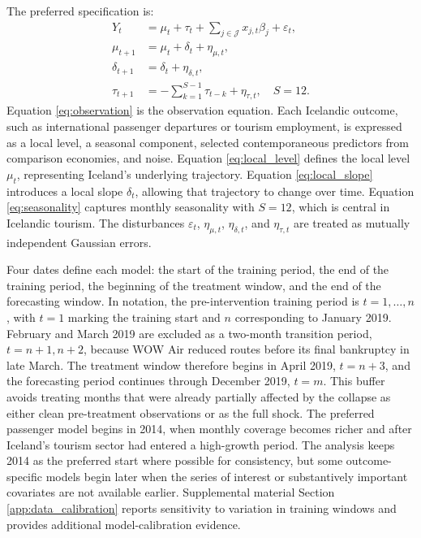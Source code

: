 \documentclass[12pt]{article}
\begin{document}
The preferred specification is:\begin{align}Y_t &= \mu_t + \tau_t + \sum_{j \in \mathcal{J}} x_{j,t}\beta_j + \varepsilon_t, \label{eq:observation} \\ \mu_{t+1} &= \mu_t + \delta_t + \eta_{\mu,t}, \label{eq:local_level} \\ \delta_{t+1} &= \delta_t + \eta_{\delta,t}, \label{eq:local_slope} \\ \tau_{t+1} &= -\sum_{k=1}^{S-1}\tau_{t-k} + \eta_{\tau,t}, \quad S=12. \label{eq:seasonality}\end{align}Equation \eqref{eq:observation} is the observation equation. Each Icelandic outcome, such as international passenger departures or tourism employment, is expressed as a local level, a seasonal component, selected contemporaneous predictors from comparison economies, and noise. Equation \eqref{eq:local_level} defines the local level $\mu_t$, representing Iceland's underlying trajectory. Equation \eqref{eq:local_slope} introduces a local slope $\delta_t$, allowing that trajectory to change over time. Equation \eqref{eq:seasonality} captures monthly seasonality with $S=12$, which is central in Icelandic tourism. The disturbances $\varepsilon_t$, $\eta_{\mu,t}$, $\eta_{\delta,t}$, and $\eta_{\tau,t}$ are treated as mutually independent Gaussian errors.

Four dates define each model: the start of the training period, the end of the training period, the beginning of the treatment window, and the end of the forecasting window. In notation, the pre-intervention training period is $t = 1, \ldots, n$, with $t=1$ marking the training start and $n$ corresponding to January 2019. February and March 2019 are excluded as a two-month transition period, $t=n+1,n+2$, because WOW Air reduced routes before its final bankruptcy in late March. The treatment window therefore begins in April 2019, $t=n+3$, and the forecasting period continues through December 2019, $t=m$. This buffer avoids treating months that were already partially affected by the collapse as either clean pre-treatment observations or as the full shock. The preferred passenger model begins in 2014, when monthly coverage becomes richer and after Iceland's tourism sector had entered a high-growth period. The analysis keeps 2014 as the preferred start where possible for consistency, but some outcome-specific models begin later when the series of interest or substantively important covariates are not available earlier. Supplemental material Section \ref{app:data_calibration} reports sensitivity to variation in training windows and provides additional model-calibration evidence.
\end{document}
